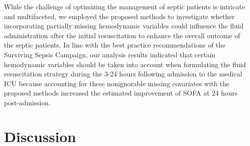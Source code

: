 \documentclass[12pt]{article}
\begin{document}


While the challenge of optimizing the management of septic patients is intricate and multifaceted, we employed the proposed methods to investigate whether incorporating partially missing hemodynamic variables could influence the fluid administration after the initial resuscitation to enhance the overall outcome of the septic patients. In line with the best practice recommendations of the Surviving Sepsis Campaign, our analysis results indicated that certain hemodynamic variables should be taken into account when formulating the fluid resuscitation strategy during the 3-24 hours following admission to the medical ICU because accounting for these nonignorable missing covariates with the proposed methods increased the estimated improvement of SOFA at 24 hours post-admission.


\section{Discussion}
\end{document}
